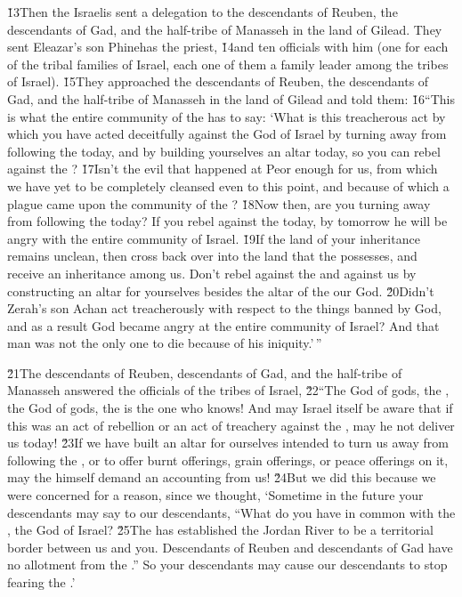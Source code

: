 \v{13}Then the Israelis sent a delegation to the descendants of Reuben, the descendants of Gad, and the half-tribe of Manasseh in the land of Gilead. They sent Eleazar's son Phinehas the priest, \v{14}and ten officials with him (one for each of the tribal families of Israel, each one of them a family leader among the tribes of Israel). \v{15}They approached the descendants of Reuben, the descendants of Gad, and the half-tribe of Manasseh in the land of Gilead and told them: \v{16}``This is what the entire community of the  has to say: `What is this treacherous act by which you have acted deceitfully against the God of Israel by turning away from following the  today, and by building yourselves an altar today, so you can rebel against the ? \v{17}Isn't the evil that happened at Peor enough for us, from which we have yet to be completely cleansed even to this point, and because of which a plague came upon the community of the ? \v{18}Now then, are you turning away from following the  today? If you rebel against the  today, by tomorrow he will be angry with the entire community of Israel. \v{19}If the land of your inheritance remains unclean, then cross back over into the land that the  possesses, and receive an inheritance among us. Don't rebel against the  and against us by constructing an altar for yourselves besides the altar of the  our God. \v{20}Didn't Zerah's son Achan act treacherously with respect to the things banned by God, and as a result God became angry at the entire community of Israel? And that man was not the only one to die because of his iniquity.'\,''

\v{21}The descendants of Reuben, descendants of Gad, and the half-tribe of Manasseh answered the officials of the tribes of Israel, \v{22}``The God of gods, the , the God of gods, the  is the one who knows! And may Israel itself be aware that if this was an act of rebellion or an act of treachery against the , may he not deliver us today! \v{23}If we have built an altar for ourselves intended to turn us away from following the , or to offer burnt offerings, grain offerings, or peace offerings on it, may the  himself demand an accounting from us! \v{24}But we did this because we were concerned for a reason, since we thought, `Sometime in the future your descendants may say to our descendants, ``What do you have in common with the , the God of Israel? \v{25}The  has established the Jordan River to be a territorial border between us and you. Descendants of Reuben and descendants of Gad have no allotment from the .'' So your descendants may cause our descendants to stop fearing the .'

